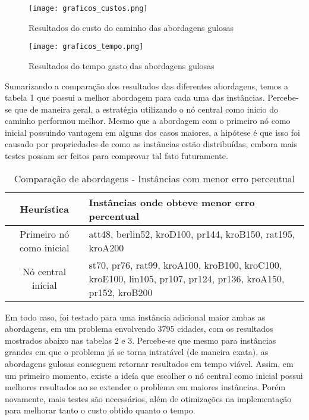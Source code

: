 \documentclass[10pt]{extarticle} %
\begin{document}
\begin{figure}[H]
    \centering
    \texttt{[image: graficos\_custos.png]}
    \caption{Resultados do custo do caminho das abordagens gulosas}
    \label{fig:Resultados abordagens gulosas}
\end{figure}

\begin{figure}[H]
    \centering
    \texttt{[image: graficos\_tempo.png]}
    \caption{Resultados do tempo gasto das abordagens gulosas}
    \label{fig:Resultados abordagens gulosas}
\end{figure}

Sumarizando a comparação dos resultados das diferentes abordagens, temos a tabela 1 que possui a melhor abordagem para cada uma das instâncias. Percebe-se que de maneira geral, a estratégia utilizando o nó central como inicio do caminho performou melhor. Mesmo que a abordagem com o primeiro nó como inicial possuindo vantagem em alguns dos casos maiores, a hipótese é que isso foi causado por propriedades de como as instâncias estão distribuídas, embora mais testes possam ser feitos para comprovar tal fato futuramente. 

\begin{table}[H]
\centering
\begin{tabular}{|c|p{12cm}|} \hline
\textbf{Heurística}               & \textbf{Instâncias onde obteve menor erro percentual}          \\ \hline
Primeiro nó como inicial & att48, berlin52, kroD100, pr144, kroB150, rat195, kroA200 \\ \hline
Nó central inicial       & st70, pr76, rat99, kroA100, kroB100, kroC100, kroE100, \newline lin105, pr107, pr124, pr136, kroA150, pr152, kroB200 \\ \hline
\end{tabular}
\caption{Comparação de abordagens - Instâncias com menor erro percentual}
\label{tab:comparison_reformatted}
\end{table}

Em todo caso, foi testado para uma instância adicional maior ambas as abordagens, em um problema envolvendo 3795 cidades, com os resultados mostrados abaixo nas tabelas 2 e 3. Percebe-se que mesmo para instâncias grandes em que o problema já se torna intratável (de maneira exata), as abordagens gulosas conseguem retornar resultados em tempo viável. Assim, em um primeiro momento, existe a ideía que escolher o nó central como inicial possui melhores resultados ao se extender o problema em maiores instâncias. Porém novamente, mais testes são necessários, além de otimizações na implementação para melhorar tanto o custo obtido quanto o tempo.
\end{document}
